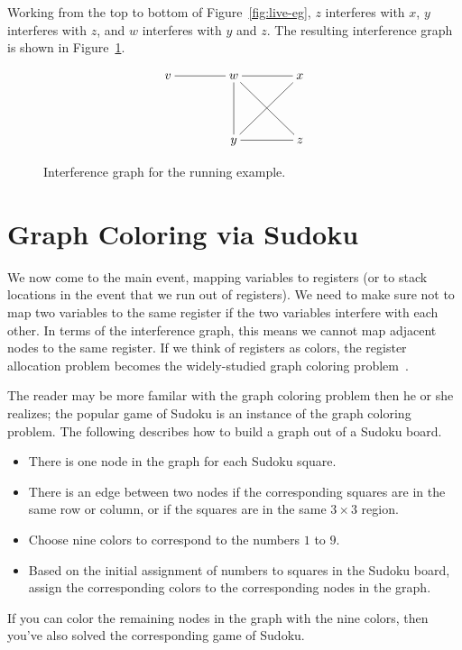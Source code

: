 \documentclass[12pt]{book}
\begin{document}
Working from the top to bottom of Figure~\ref{fig:live-eg}, $z$
interferes with $x$, $y$ interferes with $z$, and $w$ interferes with
$y$ and $z$.  The resulting interference graph is shown in
Figure~\ref{fig:interfere}.

\begin{figure}[tbp]
\large
\[
\xymatrix@=40pt{
  v \ar@{-}[r] & w \ar@{-}[r]\ar@{-}[d]\ar@{-}[dr] &  x \ar@{-}[dl]\\
               & y \ar@{-}[r] & z
}
\]
\caption{Interference graph for the running example.}
\label{fig:interfere}
\end{figure}


\section{Graph Coloring via Sudoku}

We now come to the main event, mapping variables to registers (or to
stack locations in the event that we run out of registers).  We need
to make sure not to map two variables to the same register if the two
variables interfere with each other.  In terms of the interference
graph, this means we cannot map adjacent nodes to the same register.
If we think of registers as colors, the register allocation problem
becomes the widely-studied graph coloring
problem~\citep{Balakrishnan:1996ve,Rosen:2002bh}.  

The reader may be more familar with the graph coloring problem then he
or she realizes; the popular game of Sudoku is an instance of the
graph coloring problem. The following describes how to build a graph
out of a Sudoku board.
\begin{itemize}
\item There is one node in the graph for each Sudoku square.
\item There is an edge between two nodes if the corresponding squares
  are in the same row or column, or if the squares are in the same
  $3\times 3$ region.
\item Choose nine colors to correspond to the numbers $1$ to $9$.
\item Based on the initial assignment of numbers to squares in the
  Sudoku board, assign the corresponding colors to the corresponding
  nodes in the graph.
\end{itemize}
If you can color the remaining nodes in the graph with the nine
colors, then you've also solved the corresponding game of Sudoku.
\end{document}
